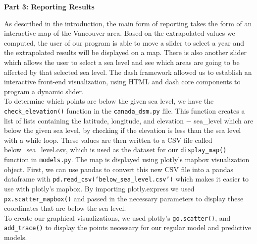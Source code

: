 \documentclass[fontsize=11pt]{article}
\begin{document}
    \textbf{Part 3: Reporting Results}

    \hspace{\parindent}As described in the introduction, the main form of reporting takes the form of an interactive map of the Vancouver area. Based on the extrapolated values we computed, the user of our program is able to move a slider to select a year and the extrapolated results will be displayed on a map. There is also another slider which allows the user to select a sea level and see which areas are going to be affected by that selected sea level. The dash framework allowed us to establish an interactive front-end visualization, using HTML and dash core components to program a dynamic slider. \\

    To determine which points are below the given sea level, we have the \texttt{check\_elevation()} function in the \texttt{canada\_dsm.py} file. This function creates a list of lists containing the latitude, longitude, and elevation $-$ sea\_level which are below the given sea level, by checking if the elevation is less than the sea level with a while loop. These values are then written to a CSV file called below\_sea\_level.csv, which is used as the dataset for our \texttt{display\_map()} function in \texttt{models.py}. The map is displayed using plotly’s mapbox visualization object. First, we can use pandas to convert this new CSV file into a pandas dataframe with \texttt{pd.read\_csv(‘below\_sea\_level.csv’)} which makes it easier to use with plotly’s mapbox. By importing plotly.express we used \texttt{px.scatter\_mapbox()} and passed in the necessary parameters to display these coordinates that are below the sea level. \\

    To create our graphical visualizations, we used plotly’s \texttt{go.scatter()}, and \texttt{add\_trace()} to display the points necessary for our regular model and predictive models.
\end{document}
